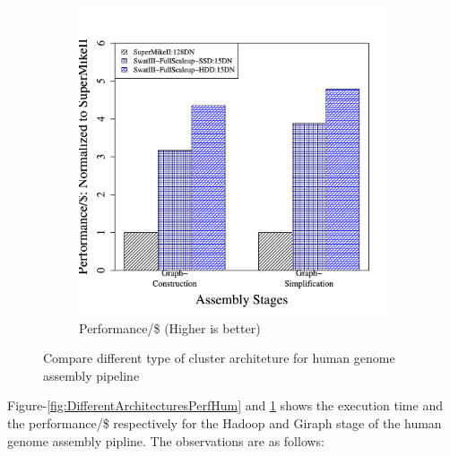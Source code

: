 \documentclass[conference]{IEEEtran}
\begin{document}
\begin{figure}[htb]
\begin{subfigure}[b]{0.23\textwidth}
                \includegraphics[width=\textwidth]{Figure/PerormanceData/Plots/PerfPerDollarDiffArchHum.pdf}
                \caption{Performance/\$ (Higher is better)}
                \label{fig:DifferentArchitecturesPerfPerDollarHum}
        \end{subfigure}
        \caption{Compare different type of cluster architeture for human genome assembly pipeline}
  \label{fig:DifferentArchitecturesHum}
  \vspace{-1.5em}
\end{figure}  
Figure-\ref{fig:DifferentArchitecturesPerfHum} and \ref{fig:DifferentArchitecturesPerfPerDollarHum} shows the execution time and the performance/\$ respectively for the Hadoop and Giraph stage of the human genome assembly pipline. 
The observations are as follows:
\end{document}

